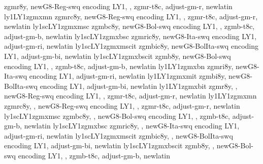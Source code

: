 %
{zgmr8y,%
newG8-Reg-swq encoding LY1,%
\metrics {},%
zgmr-t8c,%
adjust-gm-r,%
newlatin}
{ly1}{LY1}{zgmx}{m}{n}{}
%
{zgmrc8y,%
newG8-Reg-swq encoding LY1,%
\metrics {},%
zgmr-t8c,%
adjust-gm-r,%
newlatin}
{ly1sc}{LY1}{zgmx}{m}{sc}{}
%
{zgmbc8y,%
newG8-Bol-swq encoding LY1,%
\metrics {},%
zgmb-t8c,%
adjust-gm-b,%
newlatin}
{ly1sc}{LY1}{zgmx}{b}{sc}{}
%
{zgmric8y,%
newG8-Ita-swq encoding LY1,%
adjust-gm-ri,%
newlatin}
{ly1sc}{LY1}{zgmx}{m}{scit}{}
%
{zgmbic8y,%
newG8-BolIta-swq encoding LY1,%
adjust-gm-bi,%
newlatin}
{ly1sc}{LY1}{zgmx}{b}{scit}{}
%
{zgmb8y,%
newG8-Bol-swq encoding LY1,%
\metrics {},%
zgmb-t8c,%
adjust-gm-b,%
newlatin}
{ly1}{LY1}{zgmx}{b}{n}{}
%
{zgmri8y,%
newG8-Ita-swq encoding LY1,%
adjust-gm-ri,%
newlatin}
{ly1}{LY1}{zgmx}{m}{it}{}
%
{zgmbi8y,%
newG8-BolIta-swq encoding LY1,%
adjust-gm-bi,%
newlatin}
{ly1}{LY1}{zgmx}{b}{it}{}
%
{zgmr8y,%
\metrics {},%
newG8-Reg-swq encoding LY1,%
\metrics {},%
zgmr-t8c,%
adjust-gm-r,%
newlatin}
{ly1}{LY1}{zgmx}{m}{n}{}
%
{zgmrc8y,%
\metrics {},%
newG8-Reg-swq encoding LY1,%
\metrics {},%
zgmr-t8c,%
adjust-gm-r,%
newlatin}
{ly1sc}{LY1}{zgmx}{m}{sc}{}
%
{zgmbc8y,%
\metrics {},%
newG8-Bol-swq encoding LY1,%
\metrics {},%
zgmb-t8c,%
adjust-gm-b,%
newlatin}
{ly1sc}{LY1}{zgmx}{b}{sc}{}
%
{zgmric8y,%
\metrics {},%
newG8-Ita-swq encoding LY1,%
adjust-gm-ri,%
newlatin}
{ly1sc}{LY1}{zgmx}{m}{scit}{}
%
{zgmbic8y,%
\metrics {},%
newG8-BolIta-swq encoding LY1,%
adjust-gm-bi,%
newlatin}
{ly1sc}{LY1}{zgmx}{b}{scit}{}
%
{zgmb8y,%
\metrics {},%
newG8-Bol-swq encoding LY1,%
\metrics {},%
zgmb-t8c,%
adjust-gm-b,%
newlatin}

